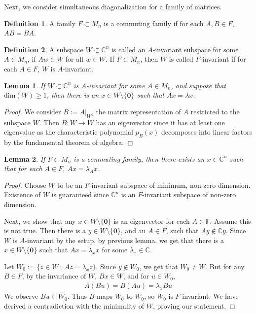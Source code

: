 \documentclass[11pt]{article}
\theoremstyle{plain} %
\newtheorem{lemma}{Lemma}[section]
\theoremstyle{definition} %
\newtheorem{definition}{Definition}[section]
\theoremstyle{remark} %
\begin{document}
Next, we consider simultaneous diagonalization for a family of matrices.
\begin{definition}
  A family $F \subset M_n$ is a commuting family if for each $A, B
  \in F$, $AB = BA$.
\end{definition}

\begin{definition}
  A subspace $W \subset \mathbb{C}^n$ is called an $A$-invariant
  subspace for some $A \in M_n$, if $Aw \in W$ for all $w \in W$. If
  $F \subset M_n$, then $W$ is called $F$-invariant if for each $A
  \in F$, $W$ is $A$-invariant.
\end{definition}

\begin{lemma}
  If $W \subset \mathbb{C}^n$ is $A$-invariant for some $A \in M_n$,
  and suppose that $\textrm{dim}(W) \ge 1$, then there is an $x \in W
  \setminus \{  \textbf{0} \}$ such that $Ax = \lambda x$.
\end{lemma}
\begin{proof}
  We consider $B:= A|_W$, the matrix representation of $A$ restricted
  to the subspace $W$. Then $B: W \to W$ has an eigenvector since it
  has at least one eigenvalue as the characteristic polynomial
  $p_B(x)$ decomposes into linear factors by the fundamental theorem of algebra.
\end{proof}

\begin{lemma}
  If $F \subset M_n$ is a commuting family, then there exists an $x
  \in \mathbb{C}^n$ such that for each $A \in F$, $Ax = \lambda_A x$.
\end{lemma}
\begin{proof}
  Choose $W$ to be an $F$-invariant subspace of minimum, non-zero
  dimension. Existence of $W$ is guaranteed since $\mathbb{C}^n$ is
  an $F$-invariant subspace of non-zero dimension.

  Next, we show that any $ x \in W \setminus \{ \textbf{0} \}$ is an
  eigenvector for each $ A \in \mathbb{F}$. Assume this is not true.
  Then there is  a $ y\in W \setminus \{ \textbf{0} \}$, and an $ A
  \in F$, such that $Ay \not\in \mathbb{C}y$. Since $W$ is
  $A$-invariant by the setup, by previous lemma, we get that there is
  a $x \in W \setminus \{ \textbf{0} \}$ such that $Ax = \lambda_x x$
  for some $\lambda_x \in \mathbb{C}$.

  Let $ W_0 := \{ z \in W \ : \ Az = \lambda_x z \}$. Since $y \notin
  W_0$, we get that $W_0 \neq W$. But for any $B \in F$, by the
  invariance of $W$, $Bx \in W$, and for $u \in W_0$,
  \begin{align*}
    A(Bu) = B(Au) =  \lambda_x Bu
  \end{align*}
  We observe $Bu \in W_0$. Thus $B$ maps $W_0$ to $W_0$, so $ W_0$ is
  $ F$-invariant. We have derived a contradiction with the minimality
  of $W$, proving our statement.
\end{proof}
\end{document}
